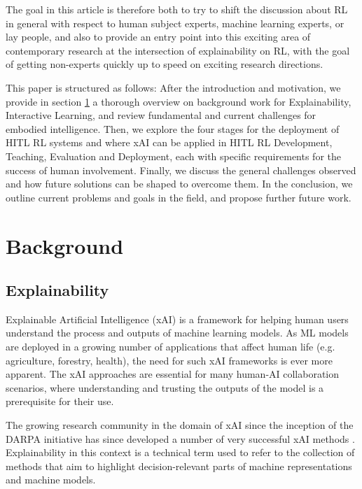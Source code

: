 \documentclass[twoside,11pt]{article}
\begin{document}
The goal in this article is therefore both to try to shift the discussion about RL in general with respect to human subject experts, machine learning experts, or lay people, and also to provide an entry point into this exciting area of contemporary research at the intersection of explainability on RL, with the goal of getting non-experts quickly up to speed on exciting research directions.

This paper is structured as follows: After the introduction and motivation, we provide in section \ref{sec:background} a thorough overview on background work for Explainability, Interactive Learning, and review fundamental and current challenges for embodied intelligence. Then, we explore the four stages for the deployment of HITL RL systems and where xAI can be applied in HITL RL Development, Teaching, Evaluation and Deployment, each with specific requirements for the success of human involvement. Finally, we discuss the general challenges observed and how future solutions can be shaped to overcome them. In the conclusion, we outline current problems and goals in the field, and propose further future work.

\section{Background}
\label{sec:background}

\subsection{Explainability}

Explainable Artificial Intelligence (xAI) is a framework for helping human users understand the process and outputs of machine learning models. As ML models are deployed in a growing number of applications that affect human life (e.g. agriculture, forestry, health), the need for such xAI frameworks is ever more apparent. The xAI approaches are essential for many human-AI collaboration scenarios, where understanding and trusting the outputs of the model is a prerequisite for their use.  

The growing research community in the domain of xAI since the inception of the DARPA initiative \citep{GunningAha:2019:DARPA} has since developed a number of very successful xAI methods \citep{ZhouEtAl:2021:QualitySurvey,HolzWoj:2022:XAIOverview}. Explainability in this context is a technical term used to refer to the collection of methods that aim to highlight decision-relevant parts of machine representations and machine models.
\end{document}
